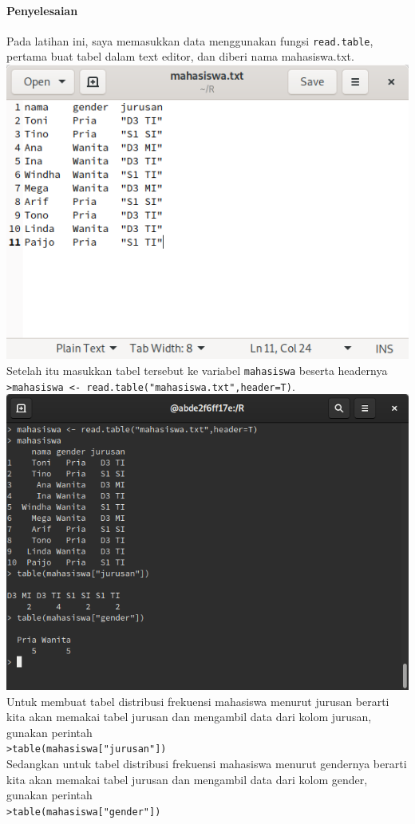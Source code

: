 \documentclass[a4paper,12pt]{article}
\begin{document}
\paragraph{Penyelesaian\\}
Pada latihan ini, saya memasukkan data menggunakan fungsi \texttt{read.table}, pertama buat tabel dalam text editor, dan diberi nama mahasiswa.txt.\\
\includegraphics[width=\linewidth]{mahasiswatxt}
Setelah itu masukkan tabel tersebut ke variabel \texttt{mahasiswa} beserta headernya\\
\texttt{>mahasiswa <- read.table("mahasiswa.txt",header=T)}.\\
\includegraphics[width=\linewidth]{5}
Untuk membuat tabel distribusi frekuensi mahasiswa menurut jurusan berarti kita akan memakai tabel jurusan dan mengambil data dari kolom jurusan, gunakan perintah\\
\texttt{>table(mahasiswa["jurusan"])}\\
Sedangkan untuk tabel distribusi frekuensi mahasiswa menurut gendernya berarti kita akan memakai tabel jurusan dan mengambil data dari kolom gender, gunakan perintah\\
\texttt{>table(mahasiswa["gender"])}\\ 
\end{document}
